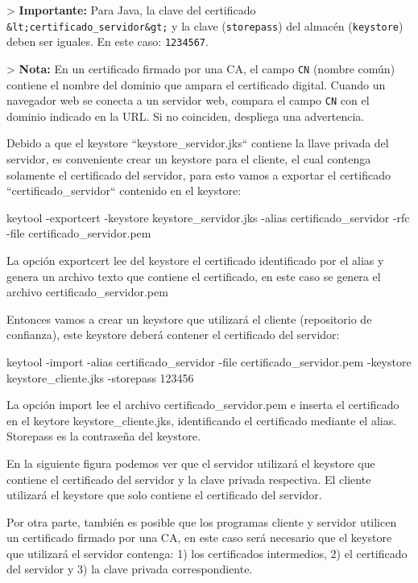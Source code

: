 \documentclass[11pt,a4paper,oneside]{book}
\begin{document}
> \textbf{Importante:} Para Java, la clave del certificado \texttt{\&lt;certificado\_servidor\&gt;} y la clave (\texttt{storepass}) del almacén (\texttt{keystore}) deben ser iguales. En este caso: \texttt{1234567}.

> \textbf{Nota:} En un certificado firmado por una CA, el campo \texttt{CN} (nombre común) contiene el nombre del dominio que ampara el certificado digital. Cuando un navegador web se conecta a un servidor web, compara el campo \texttt{CN} con el dominio indicado en la URL. Si no coinciden, despliega una advertencia.

Debido a que el keystore ``keystore\_servidor.jks`` contiene la llave privada del servidor, es conveniente crear un keystore para el cliente, el cual contenga solamente el certificado del servidor, para esto vamos a exportar el certificado ``certificado\_servidor`` contenido en el keystore:

\begin{SourceCode}
keytool -exportcert -keystore keystore_servidor.jks -alias certificado_servidor -rfc -file certificado_servidor.pem
\end{SourceCode}

La opción exportcert lee del keystore el certificado identificado por el alias y genera un archivo texto que contiene el certificado, en este caso se genera el archivo certificado\_servidor.pem

Entonces vamos a crear un keystore que utilizará el cliente (repositorio de confianza), este keystore deberá contener el certificado del servidor:

\begin{SourceCode}
keytool -import -alias certificado_servidor -file certificado_servidor.pem -keystore keystore_cliente.jks -storepass 123456
\end{SourceCode}

La opción import lee el archivo certificado\_servidor.pem e inserta el certificado en el keytore keystore\_cliente.jks, identificando el certificado mediante el alias. Storepass es la contraseña del keystore.

En la siguiente figura podemos ver que el servidor utilizará el keystore que contiene el certificado del servidor y la clave privada respectiva. El cliente utilizará el keystore que solo contiene el certificado del servidor.

Por otra parte, también es posible que los programas cliente y servidor utilicen un certificado firmado por una CA, en este caso será necesario que el keystore que utilizará el servidor contenga: 1) los certificados intermedios, 2) el certificado del servidor y 3) la clave privada correspondiente.
\end{document}
